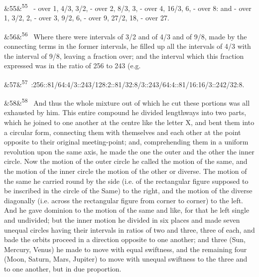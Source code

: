 \documentclass[12pt]{article}
\newcommand{\para}[1][]{\par\noindent\ifx&#1&\else\textsuperscript{\footnotesize #1}~\fi}
\begin{document}
\para[55] - over 1, 4/3, 3/2, - over 2, 8/3, 3, - over 4, 16/3, 6, - over 8: and - over 1, 3/2, 2, - over 3, 9/2, 6, - over 9, 27/2, 18, - over 27.

\para[56] Where there were intervals of 3/2 and of 4/3 and of 9/8, made by the connecting terms in the former intervals, he filled up all the intervals of 4/3 with the interval of 9/8, leaving a fraction over; and the interval which this fraction expressed was in the ratio of 256 to 243 (e.g.

\para[57] 243:256::81/64:4/3::243/128:2::81/32:8/3::243/64:4::81/16:16/3::242/32:8.

\para[58] And thus the whole mixture out of which he cut these portions was all exhausted by him. This entire compound he divided lengthways into two parts, which he joined to one another at the centre like the letter X, and bent them into a circular form, connecting them with themselves and each other at the point opposite to their original meeting-point; and, comprehending them in a uniform revolution upon the same axis, he made the one the outer and the other the inner circle. Now the motion of the outer circle he called the motion of the same, and the motion of the inner circle the motion of the other or diverse. The motion of the same he carried round by the side (i.e. of the rectangular figure supposed to be inscribed in the circle of the Same) to the right, and the motion of the diverse diagonally (i.e. across the rectangular figure from corner to corner) to the left. And he gave dominion to the motion of the same and like, for that he left single and undivided; but the inner motion he divided in six places and made seven unequal circles having their intervals in ratios of two and three, three of each, and bade the orbits proceed in a direction opposite to one another; and three (Sun, Mercury, Venus) he made to move with equal swiftness, and the remaining four (Moon, Saturn, Mars, Jupiter) to move with unequal swiftness to the three and to one another, but in due proportion.
\end{document}
